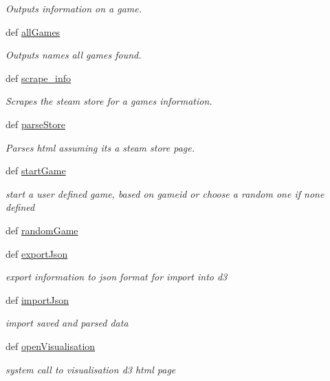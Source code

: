 \begin{DoxyCompactItemize}
\begin{DoxyCompactList}\small\item\em Outputs information on a game. \end{DoxyCompactList}\item 
def \hyperlink{class_j_g_meta_steam_1_1_j_g_meta_steam_a6785278af924d86ce5fd915d0d521f14}{all\+Games}
\begin{DoxyCompactList}\small\item\em Outputs names all games found. \end{DoxyCompactList}\item 
def \hyperlink{class_j_g_meta_steam_1_1_j_g_meta_steam_a6a34f50ae4397170316bee6f81cabbe9}{scrape\+\_\+info}
\begin{DoxyCompactList}\small\item\em Scrapes the steam store for a games information. \end{DoxyCompactList}\item 
def \hyperlink{class_j_g_meta_steam_1_1_j_g_meta_steam_af5e7d7eec9571c54e744f66ee76ea9b4}{parse\+Store}
\begin{DoxyCompactList}\small\item\em Parses html assuming its a steam store page. \end{DoxyCompactList}\item 
def \hyperlink{class_j_g_meta_steam_1_1_j_g_meta_steam_a7138734ce6e670d875b7c0d7367c2e7e}{start\+Game}
\begin{DoxyCompactList}\small\item\em start a user defined game, based on gameid or choose a random one if none defined \end{DoxyCompactList}\item 
def \hyperlink{class_j_g_meta_steam_1_1_j_g_meta_steam_ada308bf6bdb3bd2acedaa704cf34139f}{random\+Game}
\item 
def \hyperlink{class_j_g_meta_steam_1_1_j_g_meta_steam_aecd1ebee57f03a97d9a1ec4a8a3d363b}{export\+Json}
\begin{DoxyCompactList}\small\item\em export information to json format for import into d3 \end{DoxyCompactList}\item 
def \hyperlink{class_j_g_meta_steam_1_1_j_g_meta_steam_a65974fc7a029c0b970f5915f2c9de0fd}{import\+Json}
\begin{DoxyCompactList}\small\item\em import saved and parsed data \end{DoxyCompactList}\item 
def \hyperlink{class_j_g_meta_steam_1_1_j_g_meta_steam_a585febb64a52bd71d389c40eae1c6560}{open\+Visualisation}
\begin{DoxyCompactList}\small\item\em system call to visualisation d3 html page \end{DoxyCompactList}\end{DoxyCompactItemize}
